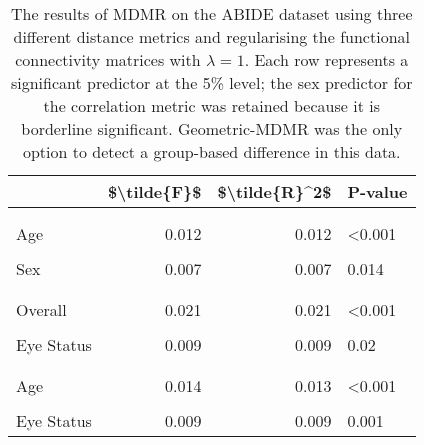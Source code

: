 \documentclass[
]{article}
\author{}
\date{\vspace{-2.5em}}
\begin{document}
\begin{table}[htbp]

\caption{\label{tab:abide_tab}The results of MDMR on the ABIDE dataset using three different distance metrics and regularising the functional connectivity matrices with $\lambda = 1$.  Each row represents a significant predictor at the 5\% level; the sex predictor for the correlation metric was retained because it is borderline significant.  Geometric-MDMR was the only option to detect a group-based difference in this data.}
\centering
\begin{tabular}[t]{lrrl}
\toprule
 & \$\textbackslash{}tilde\{F\}\$ & \$\textbackslash{}tilde\{R\}\textasciicircum{}2\$ & P-value\\
\midrule
\addlinespace[0.3em]
\multicolumn{4}{l}{\textbf{Geometric}}\\
\hspace{1em}\cellcolor{gray!6}{Overall} & \cellcolor{gray!6}{0.033} & \cellcolor{gray!6}{0.032} & \cellcolor{gray!6}{<0.001}\\
\hspace{1em}Age & 0.012 & 0.012 & <0.001\\
\hspace{1em}\cellcolor{gray!6}{Group} & \cellcolor{gray!6}{0.007} & \cellcolor{gray!6}{0.007} & \cellcolor{gray!6}{0.004}\\
\hspace{1em}Sex & 0.007 & 0.007 & 0.014\\
\hspace{1em}\cellcolor{gray!6}{Eye Status} & \cellcolor{gray!6}{0.008} & \cellcolor{gray!6}{0.007} & \cellcolor{gray!6}{0.001}\\
\addlinespace[0.3em]
\multicolumn{4}{l}{\textbf{Euclidean}}\\
\hspace{1em}Overall & 0.021 & 0.021 & <0.001\\
\hspace{1em}\cellcolor{gray!6}{Age} & \cellcolor{gray!6}{0.013} & \cellcolor{gray!6}{0.012} & \cellcolor{gray!6}{0.001}\\
\hspace{1em}Eye Status & 0.009 & 0.009 & 0.02\\
\addlinespace[0.3em]
\multicolumn{4}{l}{\textbf{Correlation}}\\
\hspace{1em}\cellcolor{gray!6}{Overall} & \cellcolor{gray!6}{0.030} & \cellcolor{gray!6}{0.029} & \cellcolor{gray!6}{<0.001}\\
\hspace{1em}Age & 0.014 & 0.013 & <0.001\\
\hspace{1em}\cellcolor{gray!6}{Sex} & \cellcolor{gray!6}{0.007} & \cellcolor{gray!6}{0.007} & \cellcolor{gray!6}{0.057}\\
\hspace{1em}Eye Status & 0.009 & 0.009 & 0.001\\
\bottomrule
\end{tabular}
\end{table}
\end{document}
